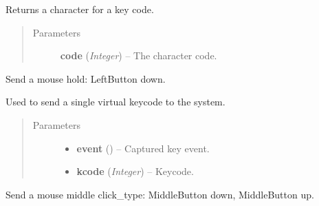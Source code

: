 \documentclass[letterpaper,10pt,english]{sphinxmanual}
\begin{document}

\begin{fulllineitems}
\label{macro:macro.get_sendkeys}
Returns a character for a key code.
\begin{quote}\begin{description}
\item[{Parameters}] \leavevmode
\textbf{code} (\emph{Integer}) -- The character code.

\end{description}\end{quote}

\end{fulllineitems}


\begin{fulllineitems}
\label{macro:macro.hold}
Send a mouse hold: LeftButton down.

\end{fulllineitems}


\begin{fulllineitems}
\label{macro:macro.key_press}
Used to send a single virtual keycode to the system.
\begin{quote}\begin{description}
\item[{Parameters}] \leavevmode\begin{itemize}
\item {} 
\textbf{event} () -- Captured key event.

\item {} 
\textbf{kcode} (\emph{Integer}) -- Keycode.

\end{itemize}

\end{description}\end{quote}

\end{fulllineitems}


\begin{fulllineitems}
\label{macro:macro.middle_click}
Send a mouse middle click\_type: MiddleButton down, MiddleButton up.

\end{fulllineitems}
\end{document}
